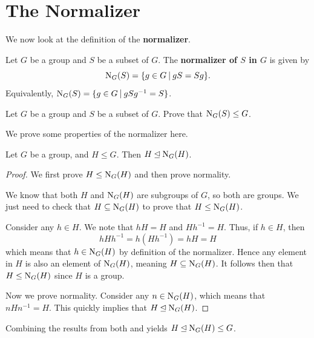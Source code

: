 \section{The Normalizer}
We now look at the definition of the \textbf{normalizer}.
\begin{definition}
    Let $G$ be a group and $S$ be a subset of $G$. The \textbf{normalizer of $S$ in $G$} is given by
    \[
        \N{G}{S} = \{g \in G \vert gS = Sg \}.
    \]
    Equivalently, $\N{G}{S} = \{g \in G \vert gSg^{-1} = S \}$.
\end{definition}
\begin{exercise}\label{exercise-normalizer-is-subgroup-of-main-group}
    Let $G$ be a group and $S$ be a subset of $G$. Prove that $\mathrm{N}_{G}(S) \leq G$.
\end{exercise}

\newpage

We prove some properties of the normalizer here.
\begin{proposition}\label{prop-subgroup-is-a-normal-subgroup-of-normalizer}
    Let $G$ be a group, and $H \leq G$. Then $H \unlhd \mathrm{N}_{G}(H)$.
\end{proposition}
\begin{proof}
    We first prove $H \leq \mathrm{N}_{G}(H)$ and then prove normality.

    We know that both $H$ and $\mathrm{N}_{G}(H)$ are subgroups of $G$, so both are groups. We just need to check that $H \subseteq \mathrm{N}_{G}(H)$ to prove that $H \leq \mathrm{N}_{G}(H)$.

    Consider any $h \in H$. We note that $hH = H$ and $Hh^{-1} = H$. Thus, if $h \in H$, then
    \[
        hHh^{-1} = h(Hh^{-1}) = hH = H
    \]
    which means that $h \in \mathrm{N}_{G}(H)$ by definition of the normalizer. Hence any element in $H$ is also an element of $\mathrm{N}_{G}(H)$, meaning $H \subseteq \mathrm{N}_{G}(H)$. It follows then that $H \leq \mathrm{N}_{G}(H)$ since $H$ is a group.

    Now we prove normality. Consider any $n \in \mathrm{N}_{G}(H)$, which means that $nHn^{-1} = H$. This quickly implies that $H \unlhd \mathrm{N}_{G}(H)$.
\end{proof}
\begin{remark}
    Combining the results from both  and  yields $H \unlhd \mathrm{N}_{G}(H) \leq G$.
\end{remark}

